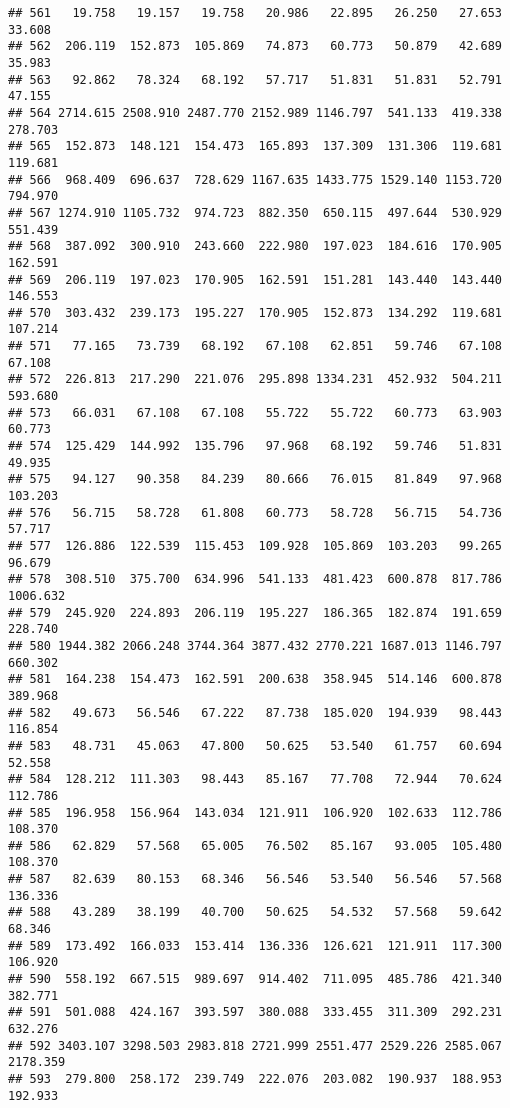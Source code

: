 \documentclass[
]{article}
\begin{document}
\begin{verbatim}
## 561   19.758   19.157   19.758   20.986   22.895   26.250   27.653   33.608
## 562  206.119  152.873  105.869   74.873   60.773   50.879   42.689   35.983
## 563   92.862   78.324   68.192   57.717   51.831   51.831   52.791   47.155
## 564 2714.615 2508.910 2487.770 2152.989 1146.797  541.133  419.338  278.703
## 565  152.873  148.121  154.473  165.893  137.309  131.306  119.681  119.681
## 566  968.409  696.637  728.629 1167.635 1433.775 1529.140 1153.720  794.970
## 567 1274.910 1105.732  974.723  882.350  650.115  497.644  530.929  551.439
## 568  387.092  300.910  243.660  222.980  197.023  184.616  170.905  162.591
## 569  206.119  197.023  170.905  162.591  151.281  143.440  143.440  146.553
## 570  303.432  239.173  195.227  170.905  152.873  134.292  119.681  107.214
## 571   77.165   73.739   68.192   67.108   62.851   59.746   67.108   67.108
## 572  226.813  217.290  221.076  295.898 1334.231  452.932  504.211  593.680
## 573   66.031   67.108   67.108   55.722   55.722   60.773   63.903   60.773
## 574  125.429  144.992  135.796   97.968   68.192   59.746   51.831   49.935
## 575   94.127   90.358   84.239   80.666   76.015   81.849   97.968  103.203
## 576   56.715   58.728   61.808   60.773   58.728   56.715   54.736   57.717
## 577  126.886  122.539  115.453  109.928  105.869  103.203   99.265   96.679
## 578  308.510  375.700  634.996  541.133  481.423  600.878  817.786 1006.632
## 579  245.920  224.893  206.119  195.227  186.365  182.874  191.659  228.740
## 580 1944.382 2066.248 3744.364 3877.432 2770.221 1687.013 1146.797  660.302
## 581  164.238  154.473  162.591  200.638  358.945  514.146  600.878  389.968
## 582   49.673   56.546   67.222   87.738  185.020  194.939   98.443  116.854
## 583   48.731   45.063   47.800   50.625   53.540   61.757   60.694   52.558
## 584  128.212  111.303   98.443   85.167   77.708   72.944   70.624  112.786
## 585  196.958  156.964  143.034  121.911  106.920  102.633  112.786  108.370
## 586   62.829   57.568   65.005   76.502   85.167   93.005  105.480  108.370
## 587   82.639   80.153   68.346   56.546   53.540   56.546   57.568  136.336
## 588   43.289   38.199   40.700   50.625   54.532   57.568   59.642   68.346
## 589  173.492  166.033  153.414  136.336  126.621  121.911  117.300  106.920
## 590  558.192  667.515  989.697  914.402  711.095  485.786  421.340  382.771
## 591  501.088  424.167  393.597  380.088  333.455  311.309  292.231  632.276
## 592 3403.107 3298.503 2983.818 2721.999 2551.477 2529.226 2585.067 2178.359
## 593  279.800  258.172  239.749  222.076  203.082  190.937  188.953  192.933

\end{verbatim}
\end{document}
